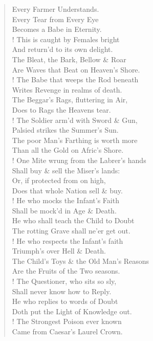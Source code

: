 \documentclass[9pt]{extarticle}
\begin{document}
\begin{verse}
\begin{altverse}
		Every Farmer Understands.\\
		Every Tear from Every Eye\\
		Becomes a Babe in Eternity.\\
		!
		This is caught by Females bright\\
		And return'd to its own delight.\\
		The Bleat, the Bark, Bellow \& Roar\\
		Are Waves that Beat on Heaven's Shore.\\
		!
		The Babe that weeps the Rod beneath\\
		Writes Revenge in realms of death.\\
		The Beggar's Rags, fluttering in Air,\\
		Does to Rags the Heavens tear.\\
		!
		The Soldier arm'd with Sword \& Gun,\\
		Palsied strikes the Summer's Sun.\\
		The poor Man's Farthing is worth more\\
		Than all the Gold on Afric's Shore.\\
		!
		One Mite wrung from the Labrer's hands\\
		Shall buy \& sell the Miser's lands:\\
		Or, if protected from on high,\\
		Does that whole Nation sell \& buy.\\
		!
		He who mocks the Infant's Faith\\
		Shall be mock'd in Age \& Death.\\
		He who shall teach the Child to Doubt\\
		The rotting Grave shall ne'er get out.\\
		!
		He who respects the Infant's faith\\
		Triumph's over Hell \& Death.\\
		The Child's Toys \& the Old Man's Reasons\\
		Are the Fruits of the Two seasons.\\
		!
		The Questioner, who sits so sly,\\
		Shall never know how to Reply.\\
		He who replies to words of Doubt\\
		Doth put the Light of Knowledge out.\\
		!
		The Strongest Poison ever known\\
		Came from Caesar's Laurel Crown.\\

\end{altverse}
\end{verse}
\end{document}
